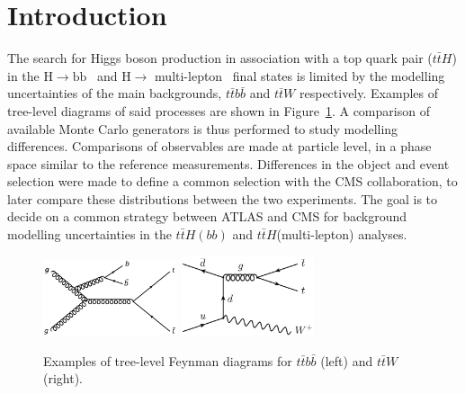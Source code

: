 \section{Introduction}
\label{sec:intro}
The search for Higgs boson production in association with a top quark pair ($t\bar{t}H$) in the $\mathrm{H\rightarrow bb}$~\cite{HIGG-2017-03} and $\mathrm{H\rightarrow}$ multi-lepton~\cite{ATLAS-CONF-2019-045} final states is limited by the modelling uncertainties of the main backgrounds, $t\bar{t}b\bar{b}$ and $t\bar{t}W$ respectively. %
Examples of tree-level diagrams of said processes are shown in Figure~\ref{intro:sig}. A comparison of available Monte Carlo generators is thus performed to study modelling differences. Comparisons of observables are made at particle level, in a phase space similar to the reference measurements. Differences in the object and event selection were made to define a common selection with the CMS collaboration, to later compare these distributions between the two experiments. The goal is to decide on a common strategy between ATLAS and CMS for background modelling uncertainties in the $t\bar{t}H(bb)$ and $t\bar{t}H$(multi-lepton) analyses.

\begin{figure}[!htb]
\centering
\includegraphics[width=0.35\textwidth]{Plots/ttbb/ttbb}
\includegraphics[width=0.35\textwidth]{Plots/ttV/ttW}
  \caption{Examples of tree-level Feynman diagrams for $t\bar{t}b\bar{b}$ (left) and $t\bar{t}W$ (right). \label{intro:sig}}
\end{figure}